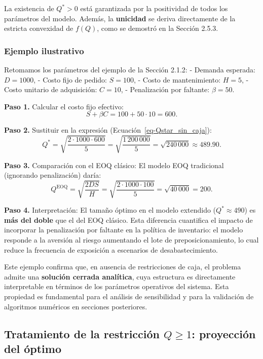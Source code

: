 \documentclass[
  spanish,
  us-letterpaper,
  DIV=11,
  numbers=noendperiod]{scrreprt}
\numberwithin{equation}{section}
\begin{document}
La existencia de \(Q^* > 0\) está garantizada por la positividad de
todos los parámetros del modelo. Además, la \textbf{unicidad} se deriva
directamente de la estricta convexidad de \(f(Q)\), como se demostró en
la Sección 2.5.3.

\subsubsection{Ejemplo ilustrativo}\label{ejemplo-ilustrativo-6}

Retomamos los parámetros del ejemplo de la Sección 2.1.2: - Demanda
esperada: \(D = 1000\), - Costo fijo de pedido: \(S = 100\), - Costo de
mantenimiento: \(H = 5\), - Costo unitario de adquisición: \(C = 10\), -
Penalización por faltante: \(\beta = 50\).

\textbf{Paso 1.} Calcular el costo fijo efectivo: \[
S + \beta C = 100 + 50 \cdot 10 = 600.
\]

\textbf{Paso 2.} Sustituir en la expresión
(Ecuación~\ref{eq-Qstar_sin_caja}): \[
Q^* = \sqrt{\frac{2 \cdot 1000 \cdot 600}{5}} = \sqrt{\frac{1\,200\,000}{5}} = \sqrt{240\,000} \approx 489.90.
\]

\textbf{Paso 3.} Comparación con el EOQ clásico: El modelo EOQ
tradicional (ignorando penalización) daría: \[
Q^{\text{EOQ}} = \sqrt{\frac{2 D S}{H}} = \sqrt{\frac{2 \cdot 1000 \cdot 100}{5}} = \sqrt{40\,000} = 200.
\]

\textbf{Paso 4.} Interpretación: El tamaño óptimo en el modelo extendido
(\(Q^* \approx 490\)) es \textbf{más del doble} que el del EOQ clásico.
Esta diferencia cuantifica el impacto de incorporar la penalización por
faltante en la política de inventario: el modelo responde a la aversión
al riesgo aumentando el lote de preposicionamiento, lo cual reduce la
frecuencia de exposición a escenarios de desabastecimiento.

Este ejemplo confirma que, en ausencia de restricciones de caja, el
problema admite una \textbf{solución cerrada analítica}, cuya estructura
es directamente interpretable en términos de los parámetros operativos
del sistema. Esta propiedad es fundamental para el análisis de
sensibilidad y para la validación de algoritmos numéricos en secciones
posteriores.

\subsection{\texorpdfstring{Tratamiento de la restricción \(Q \geq 1\):
proyección del
óptimo}{Tratamiento de la restricción Q \textbackslash geq 1: proyección del óptimo}}\label{tratamiento-de-la-restricciuxf3n-q-geq-1-proyecciuxf3n-del-uxf3ptimo}
\end{document}
